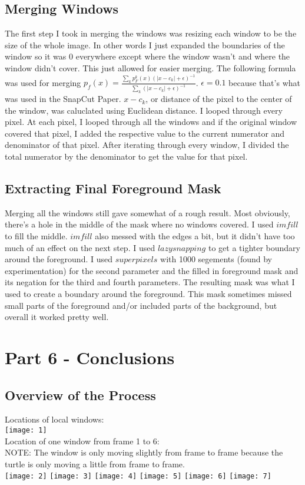 \documentclass[10pt]{article}
\begin{document}
\subsection{Merging Windows}
The first step I took in merging the windows was resizing each window to be the size of the whole image. In other words I just expanded the boundaries of the window so it was 0 everywhere except where the window wasn't and where the window didn't cover. This just allowed for easier merging. The following formula was used for merging $p_f(x) = \frac{\sum_k p^k_F(x) (|x - c_k| + \epsilon)^{-1}}{\sum_k(|x - c_k| + \epsilon)^{-1}}$. $\epsilon = 0.1$ because that's what was used in the SnapCut Paper. $x - c_k$, or distance of the pixel to the center of the window, was caluclated using Euclidean distance. I looped through every pixel. At each pixel, I looped through all the windows and if the original window covered that pixel, I added the respective value to the current numerator and denominator of that pixel. After iterating through every window, I divided the total numerator by the denominator to get the value for that pixel.
\subsection{Extracting Final Foreground Mask}
Merging all the windows still gave somewhat of a rough result. Most obviously, there's a hole in the middle of the mask where no windows covered. I used $imfill$ to fill the middle. $imfill$ also messed with the edges a bit, but it didn't have too much of an effect on the next step. I used $lazysnapping$ to get a tighter boundary around the foreground. I used $superpixels$ with 1000 segements (found by experimentation) for the second parameter and the filled in foreground mask and its negation for the third and fourth parameters. The resulting mask was what I used to create a boundary around the foreground. This mask sometimes missed small parts of the foreground and/or included parts of the background, but overall it worked pretty well.

\section{Part 6 - Conclusions}
\subsection{Overview of the Process}
Locations of local windows: \\
\texttt{[image: 1]} \\
Location of one window from frame 1 to 6: \\
NOTE: The window is only moving slightly from frame to frame because the turtle is only moving a little from frame to frame. \\
\texttt{[image: 2]} 
\texttt{[image: 3]} 
\texttt{[image: 4]} 
\texttt{[image: 5]} 
\texttt{[image: 6]}
\texttt{[image: 7]} \\
\pagebreak
\end{document}
